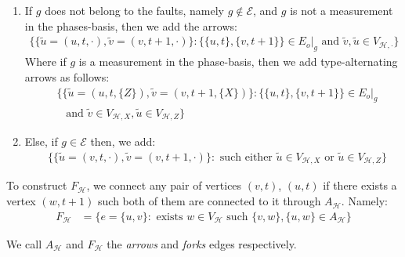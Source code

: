 \begin{definition}
\begin{enumerate}
        \begin{enumerate}
          \item If $g$ does not belong to the faults, namely $g \notin \mathcal{E}$, and $g$ is not a measurement in the phases-basis, then we add the arrows: 
            \begin{equation*}
              \begin{split}
                 \bigl\{  \{ \tilde{u} = (u,t, \cdot),  \tilde{v} = (v,t+1, \cdot)\} : \{\{u,t\},\{v,t+1\}\} \in E_{o}|_{g} \text{ and } \tilde{v},\tilde{u} \in V_{\mathcal{H}, \cdot} \bigr\}
              \end{split}
            \end{equation*}
            Where if $g$ is a measurement in the phase-basis, then we add type-alternating arrows as follows:
            \begin{equation*}
              \begin{split}
                & \bigl\{  \{ \tilde{u} = (u,t, \{Z\}),  \tilde{v} = (v,t+1, \{X\})\} : \{\{u,t\},\{v,t+1\}\} \in E_{o}|_{g} \\
              &  \, \, \, \text{ and } \tilde{v}\in V_{\mathcal{H},X},\tilde{u} \in V_{\mathcal{H},Z} \bigr\} 
              \end{split}
            \end{equation*}
          \item Else, if $g \in \mathcal{E}$ then, we add:   
            \begin{equation*}
              \begin{split}
                & \bigl\{  \{ \tilde{u} = (v,t, \cdot),  \tilde{v} = (v,t+1, \cdot)\} : \text{ such either } \tilde{u} \in V_{\mathcal{H},X} \text { or } \tilde{u} \in V_{\mathcal{H},Z} \bigr\} 
              \end{split}
            \end{equation*}
        \end{enumerate}
            To construct $F_{\mathcal{H}}$, we connect any pair of vertices $(v,t)$, $(u,t)$ if there exists a vertex $(w,t+1)$ such both of them are connected to it through $A_{\mathcal{H}}$. Namely: 
        \begin{equation*}
          \begin{split}
            F_{\mathcal{H}} &= \big\{ e = \{u,v\} : \text{ exists } w \in V_{\mathcal{H}} \text{ such } \{v,w\},\{u,w\} \in A_{\mathcal{H}} \big\} 
          \end{split}
        \end{equation*}
    \end{enumerate}
    We call $A_{\mathcal{H}}$ and $F_{\mathcal{H}}$ the \textit{arrows} and \textit{forks} edges respectively. 
\end{definition}













